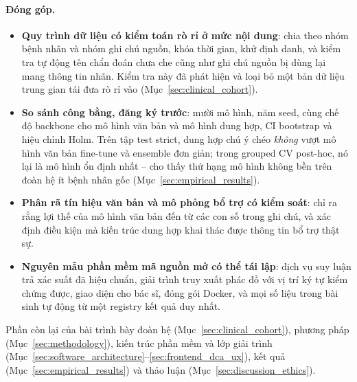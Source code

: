\paragraph{Đóng góp.}
\begin{itemize}[leftmargin=1.8em, itemsep=0.2em]
  \item \textbf{Quy trình dữ liệu có kiểm toán rò rỉ ở mức nội dung}: chia theo nhóm bệnh nhân và nhóm ghi chú nguồn, khóa thời gian, khử định danh, và kiểm tra tự động tên chẩn đoán chưa che cũng như ghi chú nguồn bị dùng lại mang thông tin nhãn. Kiểm tra này đã phát hiện và loại bỏ một bản dữ liệu trung gian tái đưa rò rỉ vào (Mục~\ref{sec:clinical_cohort}).
  \item \textbf{So sánh công bằng, đăng ký trước}: mười mô hình, năm seed, cùng chế độ backbone cho mô hình văn bản và mô hình dung hợp, CI bootstrap và hiệu chỉnh Holm. Trên tập test strict, dung hợp chú ý chéo \emph{không} vượt mô hình văn bản fine-tune và ensemble đơn giản; trong grouped CV post-hoc, nó lại là mô hình ổn định nhất -- cho thấy thứ hạng mô hình không bền trên đoàn hệ ít bệnh nhân gốc (Mục~\ref{sec:empirical_results}).
  \item \textbf{Phân rã tín hiệu văn bản và mô phỏng bổ trợ có kiểm soát}: chỉ ra rằng lợi thế của mô hình văn bản đến từ các con số trong ghi chú, và xác định điều kiện mà kiến trúc dung hợp khai thác được thông tin bổ trợ thật sự.
  \item \textbf{Nguyên mẫu phần mềm mã nguồn mở có thể tái lập}: dịch vụ suy luận trả xác suất đã hiệu chuẩn, giải trình truy xuất phác đồ với vị trí ký tự kiểm chứng được, giao diện cho bác sĩ, đóng gói Docker, và mọi số liệu trong bài sinh tự động từ một registry kết quả duy nhất.
\end{itemize}

Phần còn lại của bài trình bày đoàn hệ (Mục~\ref{sec:clinical_cohort}), phương pháp (Mục~\ref{sec:methodology}), kiến trúc phần mềm và lớp giải trình (Mục~\ref{sec:software_architecture}--\ref{sec:frontend_dca_ux}), kết quả (Mục~\ref{sec:empirical_results}) và thảo luận (Mục~\ref{sec:discussion_ethics}).
